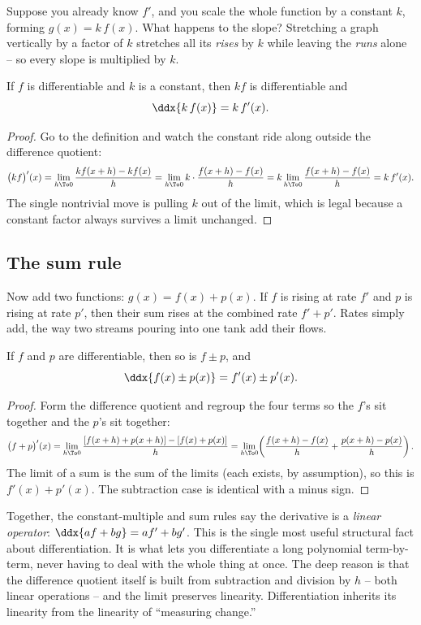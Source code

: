 Suppose you already know $f'$, and you scale the whole function by a constant $k$, forming
$g(x)=k\,f(x)$. What happens to the slope? Stretching a graph vertically by a factor of
$k$ stretches all its \emph{rises} by $k$ while leaving the \emph{runs} alone -- so every
slope is multiplied by $k$.

\begin{theorem}\label{ch11:thm-constmult}
If $f$ is differentiable and $k$ is a constant, then $k f$ is differentiable and
\[
  \ddx{k\,f(x)} = k\,f'(x).
\]
\end{theorem}

\begin{proof}
Go to the definition and watch the constant ride along outside the difference quotient:
\[
  \big(kf\big)'(x)
  = \lim_{h\To 0}\frac{k f(x+h)-k f(x)}{h}
  = \lim_{h\To 0} k\cdot\frac{f(x+h)- f(x)}{h}
  = k\lim_{h\To 0}\frac{f(x+h)- f(x)}{h}
  = k\,f'(x).
\]
The single nontrivial move is pulling $k$ out of the limit, which is legal because a
constant factor always survives a limit unchanged.
\end{proof}

\subsection{The sum rule}

Now add two functions: $g(x)=f(x)+p(x)$. If $f$ is rising at rate $f'$ and $p$ is rising
at rate $p'$, then their sum rises at the combined rate $f'+p'$. Rates simply add, the
way two streams pouring into one tank add their flows.

\begin{theorem}\label{ch11:thm-sum}
If $f$ and $p$ are differentiable, then so is $f\pm p$, and
\[
  \ddx{f(x)\pm p(x)} = f'(x)\pm p'(x).
\]
\end{theorem}

\begin{proof}
Form the difference quotient and regroup the four terms so the $f$'s sit together and the
$p$'s sit together:
\[
  \big(f+p\big)'(x)
  = \lim_{h\To 0}\frac{[f(x+h)+p(x+h)] - [f(x)+p(x)]}{h}
  = \lim_{h\To 0}\!\left(\frac{f(x+h)-f(x)}{h} + \frac{p(x+h)-p(x)}{h}\right).
\]
The limit of a sum is the sum of the limits (each exists, by assumption), so this is
$f'(x)+p'(x)$. The subtraction case is identical with a minus sign.
\end{proof}

\begin{whybox}
Together, the constant-multiple and sum rules say the derivative is a \emph{linear
operator}: $\ddx{a f + b g} = a f' + b g'$. This is the single most useful structural
fact about differentiation. It is what lets you differentiate a long polynomial
term-by-term, never having to deal with the whole thing at once. The deep reason is that
the difference quotient itself is built from subtraction and division by $h$ -- both
linear operations -- and the limit preserves linearity. Differentiation inherits its
linearity from the linearity of ``measuring change.''
\end{whybox}


